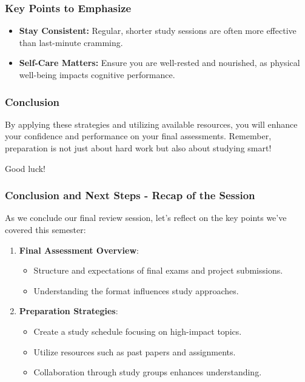 \documentclass[aspectratio=169]{beamer}
\begin{document}
\begin{frame}[fragile]
    \frametitle{Key Points to Emphasize}
    \begin{itemize}
        \item \textbf{Stay Consistent:} Regular, shorter study sessions are often more effective than last-minute cramming.
        \item \textbf{Self-Care Matters:} Ensure you are well-rested and nourished, as physical well-being impacts cognitive performance.
    \end{itemize}
\end{frame}

\begin{frame}[fragile]
    \frametitle{Conclusion}
    By applying these strategies and utilizing available resources, you will enhance your confidence and performance on your final assessments. 
    Remember, preparation is not just about hard work but also about studying smart!
    
    Good luck!
\end{frame}

\begin{frame}[fragile]
  \frametitle{Conclusion and Next Steps - Recap of the Session}
  As we conclude our final review session, let’s reflect on the key points we've covered this semester:
  \begin{enumerate}
      \item \textbf{Final Assessment Overview}:
      \begin{itemize}
          \item Structure and expectations of final exams and project submissions.
          \item Understanding the format influences study approaches.
      \end{itemize}
      \item \textbf{Preparation Strategies}:
      \begin{itemize}
          \item Create a study schedule focusing on high-impact topics.
          \item Utilize resources such as past papers and assignments.
          \item Collaboration through study groups enhances understanding.
      \end{itemize}
  \end{enumerate}
\end{frame}
\end{document}
